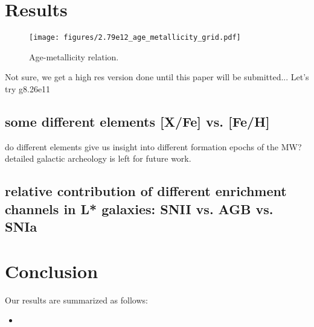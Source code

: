 \documentclass[useAMS,usenatbib]{mnras}
\begin{document}
%            



\section{Results} \label{sec:results}


\begin{figure}
    \begin{centering}
        \texttt{[image: figures/2.79e12\_age\_metallicity\_grid.pdf]}
        \caption{
            Age-metallicity relation.
        }
        \label{fig:half_mass}
    \end{centering}
\end{figure}


Not sure, we get a high res version done until this paper will be submitted...
Let's try g8.26e11


\subsection{some different elements [X/Fe] vs. [Fe/H]}
do different elements give us insight into different formation epochs of the MW?
detailed galactic archeology is left for future work.

\subsection{relative contribution of different enrichment channels in L* galaxies: SNII vs. AGB vs. SNIa}


\section{Conclusion}
\label{sec:conclusion}



Our results are summarized as follows:
\begin{itemize}
%
\item 

\end{itemize}
\end{document}
